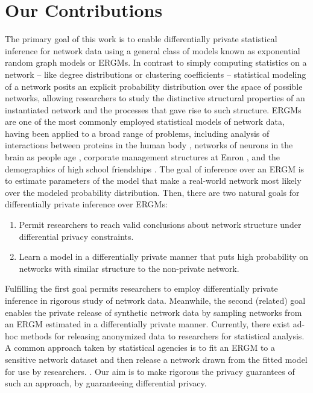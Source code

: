 \section{Our Contributions}

The primary goal of this work is to enable differentially private statistical inference for network data using a general class of models known as exponential random graph models or ERGMs. In contrast to simply computing statistics on a network -- like degree distributions or clustering coefficients -- statistical modeling of a network posits an explicit probability distribution over the space of possible networks, allowing researchers to study the distinctive structural properties of an instantiated network and the processes that gave rise to such structure. ERGMs are one of the most commonly employed statistical models of network data, having been applied to a broad range of problems, including analysis of interactions between proteins in the human body \cite{EBB10}, networks of neurons in the brain as people age  \cite{Sin+16}, corporate management structures at Enron  \cite{UHH13}, and the demographics of high school friendships \cite{GKM09}. The goal of inference over an ERGM is to estimate parameters of the model that make a real-world network most likely over the modeled probability distribution. Then, there are two natural goals for differentially private inference over ERGMs:
\vspace{-1.5em}
\begin{enumerate}
	\item Permit researchers to reach valid conclusions about network structure under differential privacy constraints.
	\item Learn a model in a differentially private manner that puts high probability on networks with similar structure to the non-private network.
\end{enumerate}
\vspace{-1.5em}
Fulfilling the first goal permits researchers to employ differentially private inference in rigorous study of network data. Meanwhile, the second (related) goal enables the private release of synthetic network data by sampling networks from an ERGM estimated in a differentially private manner. Currently, there exist ad-hoc methods for releasing anonymized data to researchers for statistical analysis. A common approach taken by statistical agencies is to fit an ERGM to a sensitive network dataset and then release a network drawn from the fitted model for use by researchers. \cite{ergm}. Our aim is to make rigorous the privacy guarantees of such an approach, by guaranteeing differential privacy. 

